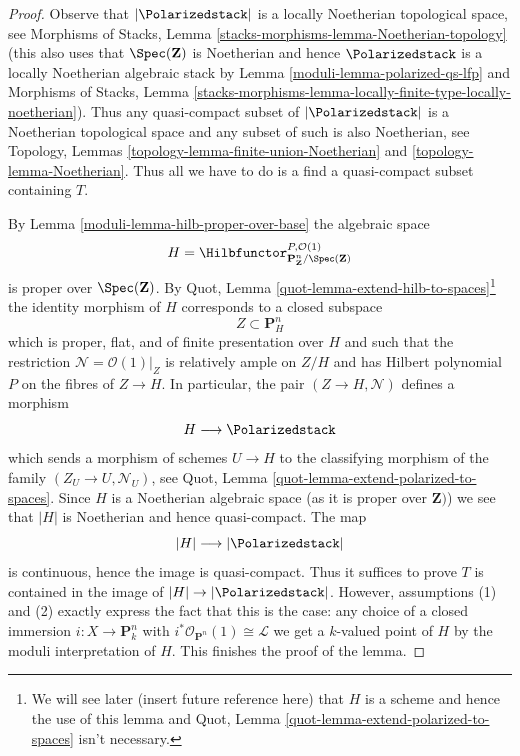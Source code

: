\begin{proof}

Observe that $|\Polarizedstack|$ is a locally Noetherian topological
space, see Morphisms of Stacks, Lemma
\ref{stacks-morphisms-lemma-Noetherian-topology}
(this also uses that $\Spec(\mathbf{Z})$ is Noetherian and
hence $\Polarizedstack$ is a locally Noetherian algebraic stack
by Lemma \ref{moduli-lemma-polarized-qs-lfp} and
Morphisms of Stacks, Lemma
\ref{stacks-morphisms-lemma-locally-finite-type-locally-noetherian}).
Thus any quasi-compact subset of $|\Polarizedstack|$ is
a Noetherian topological space and any subset of such is
also Noetherian, see
Topology, Lemmas \ref{topology-lemma-finite-union-Noetherian} and
\ref{topology-lemma-Noetherian}.
Thus all we have to do is a find a quasi-compact subset
containing $T$.

\medskip\noindent
By Lemma \ref{moduli-lemma-hilb-proper-over-base} the algebraic space
$$
H =
\Hilbfunctor^{P, \mathcal{O}(1)}_{\mathbf{P}^n_\mathbf{Z}/\Spec(\mathbf{Z})}
$$
is proper over $\Spec(\mathbf{Z})$. By
Quot, Lemma \ref{quot-lemma-extend-hilb-to-spaces}\footnote{We will see
later (insert future reference here) that $H$ is a scheme and hence the
use of this lemma and Quot, Lemma \ref{quot-lemma-extend-polarized-to-spaces}
isn't necessary.} the identity morphism of $H$ corresponds
to a closed subspace
$$
Z \subset \mathbf{P}^n_H
$$
which is proper, flat, and of finite presentation over $H$ and
such that the restriction $\mathcal{N} = \mathcal{O}(1)|_Z$
is relatively ample on $Z/H$ and has Hilbert polynomial $P$
on the fibres of $Z \to H$. In particular, the pair $(Z \to H, \mathcal{N})$
defines a morphism
$$
H \longrightarrow \Polarizedstack
$$
which sends a morphism of schemes $U \to H$ to the classifying morphism
of the family $(Z_U \to U, \mathcal{N}_U)$, see
Quot, Lemma \ref{quot-lemma-extend-polarized-to-spaces}.
Since $H$ is a Noetherian algebraic space
(as it is proper over $\mathbf{Z})$)
we see that $|H|$ is Noetherian and hence quasi-compact. The map
$$
|H| \longrightarrow |\Polarizedstack|
$$
is continuous, hence the image is quasi-compact.
Thus it suffices to prove $T$ is contained
in the image of $|H| \to |\Polarizedstack|$.
However, assumptions (1) and (2) exactly express the fact
that this is the case: any choice of a closed immersion
$i : X \to \mathbf{P}^n_k$ with
$i^*\mathcal{O}_{\mathbf{P}^n}(1) \cong \mathcal{L}$ we get a
$k$-valued point of $H$ by the moduli interpretation of $H$.
This finishes the proof of the lemma.
\end{proof}

